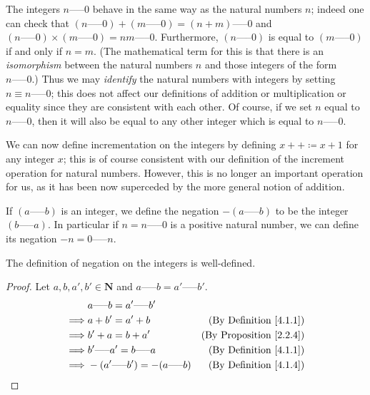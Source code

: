 \begin{note}
    The integers \(n \text{-----} 0\) behave in the same way as the natural numbers \(n\);
    indeed one can check that \((n \text{-----} 0) + (m \text{-----} 0) = (n + m) \text{-----} 0\) and \((n \text{-----} 0) \times (m \text{-----} 0) = nm \text{-----} 0\).
    Furthermore, \((n \text{-----} 0)\) is equal to \((m \text{-----} 0)\) if and only if \(n = m\).
    (The mathematical term for this is that there is an \emph{isomorphism} between the natural numbers \(n\) and those integers of the form \(n \text{-----} 0\).)
    Thus we may \emph{identify} the natural numbers with integers by setting \(n \equiv n \text{-----} 0\);
    this does not affect our definitions of addition or multiplication or equality since they are consistent with each other.
    Of course, if we set \(n\) equal to \(n \text{-----} 0\), then it will also be equal to any other integer which is equal to \(n \text{-----} 0\).
\end{note}

\begin{note}
    We can now define incrementation on the integers by defining \(x++ \coloneqq x + 1\) for any integer \(x\);
    this is of course consistent with our definition of the increment operation for natural numbers.
    However, this is no longer an important operation for us, as it has been now superceded by the more general notion of addition.
\end{note}

\begin{definition}\label{4.1.4}
    If \((a \text{-----} b)\) is an integer, we define the negation \(-(a \text{-----} b)\) to be the integer \((b \text{-----} a)\).
    In particular if \(n = n \text{-----} 0\) is a positive natural number, we can define its negation \(-n = 0 \text{-----} n\).
\end{definition}

\begin{additional corollary}\label{ac 4.1.2}
The definition of negation on the integers is well-defined.
\end{additional corollary}

\begin{proof}
    Let \(a, b, a', b' \in \mathbf{N}\) and \(a \text{-----} b = a' \text{-----} b'\).
    \begin{align*}
                 & a \text{-----} b = a' \text{-----} b'                                             \\
        \implies & a + b' = a' + b                             & \text{(By Definition \ref{4.1.1})}  \\
        \implies & b' + a = b + a'                             & \text{(By Proposition \ref{2.2.4})} \\
        \implies & b' \text{-----} a' = b \text{-----} a       & \text{(By Definition \ref{4.1.1})}  \\
        \implies & -(a' \text{-----} b') = -(a \text{-----} b) & \text{(By Definition \ref{4.1.4})}  \\
    \end{align*}
\end{proof}

